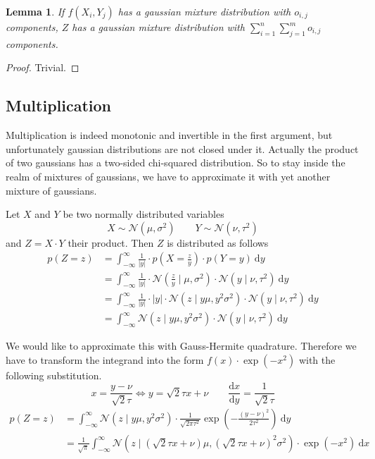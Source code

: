 \documentclass[11pt]{article}
\newtheorem{lemma}{Lemma}
\begin{document}
\begin{lemma}
  If $f(X_{i}, Y_{j})$ has a gaussian mixture distribution with $o_{i,j}$
  components, $Z$ has a gaussian mixture distribution with
  $\sum_{i = 1}^{n} \sum_{j = 1}^{m} o_{i,j}$ components.
\end{lemma}

\begin{proof}
  Trivial.
\end{proof}

\subsection{Multiplication}

Multiplication is indeed monotonic and invertible in the first argument, but
unfortunately gaussian distributions are not closed under it. Actually the
product of two gaussians has a two-sided chi-squared distribution. So to stay
inside the realm of mixtures of gaussians, we have to approximate it with yet
another mixture of gaussians.

Let $X$ and $Y$ be two normally distributed variables
\begin{equation*}
  X \sim \mathcal{N}(\mu, \sigma^{2}) \qquad Y \sim \mathcal{N}(\nu, \tau^{2})
\end{equation*}
and $Z = X \cdot Y$ their product. Then $Z$ is distributed as follows
\begin{align*}
  p(Z = z) & = \int_{-\infty}^{\infty} \frac{1}{|y|} \cdot p\left(X = \frac{z}{y}\right) \cdot p(Y = y)~\mathrm{d}y\\
           & = \int_{-\infty}^{\infty} \frac{1}{|y|} \cdot \mathcal{N}\left( \frac{z}{y} \mid \mu, \sigma^{2} \right) \cdot \mathcal{N}(y \mid \nu, \tau^{2})~\mathrm{d}y\\
           & = \int_{-\infty}^{\infty} \frac{1}{|y|} \cdot |y| \cdot \mathcal{N}\left( z \mid y\mu, y^{2}\sigma^{2} \right) \cdot \mathcal{N}(y \mid \nu, \tau^{2})~\mathrm{d}y\\
           & = \int_{-\infty}^{\infty} \mathcal{N}\left( z \mid y\mu, y^{2}\sigma^{2} \right) \cdot \mathcal{N}(y \mid \nu, \tau^{2})~\mathrm{d}y
\end{align*}

We would like to approximate this with Gauss-Hermite quadrature. Therefore we
have to transform the integrand into the form $f(x) \cdot \exp(-x^{2})$ with the
following substitution.
\begin{equation*}
  x = \frac{y - \nu}{\sqrt{2}\tau} \Leftrightarrow y = \sqrt{2}\tau x + \nu \qquad \frac{\mathrm{d}x}{\mathrm{d}y} = \frac{1}{\sqrt{2}\tau}
\end{equation*}
\begin{align*}
  p(Z = z) & = \int_{-\infty}^{\infty} \mathcal{N}\left( z \mid y\mu, y^{2}\sigma^{2} \right) \cdot \frac{1}{\sqrt{2\pi\tau^{2}}} \exp\left( -\frac{(y - \nu)^{2}}{2\tau^{2}} \right)~\mathrm{d}y\\
           & = \frac{1}{\sqrt{\pi}} \int_{-\infty}^{\infty} \mathcal{N}\left( z \mid \left(\sqrt{2}\tau x + \nu\right)\mu, \left(\sqrt{2}\tau x + \nu\right)^{2}\sigma^{2} \right) \cdot \exp\left( -x^{2} \right)~\mathrm{d}x
\end{align*}
\end{document}
